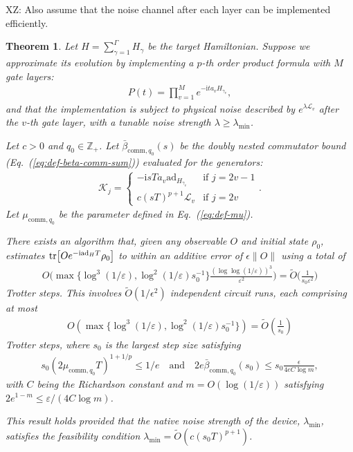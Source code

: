 \documentclass[11pt]{article}
\newtheorem{theorem}{Theorem}
\newcommand{\eq}[1]{(\ref{eq:#1})}
\renewcommand{\i}{\mathrm{i}}
\renewcommand{\L}{\mathcal{L}}
\newcommand{\ad}{\mathrm{ad}}
\newcommand{\eps}{\varepsilon}
\newcommand{\mb}{\mathbb}
\newcommand{\xz}[1]{{\color{cyan} XZ: #1}}
\begin{document}
\xz{Also assume that the noise channel after each layer can be implemented efficiently. }
\begin{theorem}
\label{thm:general-application}
    Let $H = \sum_{\gamma = 1}^{\Gamma} H_{\gamma}$ be the target Hamiltonian. Suppose we approximate its evolution by implementing a $p$-th order product formula with $M$ gate layers:
    \begin{align*}
        P(t) = \prod_{v=1}^M e^{-\i t a_v H_{\gamma_v}},
    \end{align*}
    and that the implementation is subject to physical noise described by $e^{\lambda \L_v}$ after the $v$-th gate layer, with a tunable noise strength $\lambda \ge \lambda_{\min}$.
    
    Let $c>0$ and $q_0\in \mb Z_+$. Let $\bar{\beta}_{\mathrm{comm},q_0}(s)$ be the doubly nested commutator bound (Eq.~\eq{def-beta-comm-sum}) evaluated for the generators:
    \begin{align*}
        \mathcal{K}_j= \begin{cases}-\i sT a_{v}\ad_{H_{\gamma_v}} & \text{if } j = 2v-1\\ c(sT)^{p+1}\mathcal{L}_v & \text{if } j = 2v \end{cases}.
    \end{align*}
    Let $\mu_{\mathrm{comm},q_0}$ be the parameter defined in Eq.~\eq{def-mu}. 
    
    There exists an algorithm that, given any observable $O$ and initial state $\rho_0$, estimates $\tr[O e^{-\i \ad_H T}\rho_0]$ to within an additive error of $\epsilon\|O\|$ using a total of \begin{align*}
        O\Big( \max\{\log^3(1/\eps), \log^2(1/\eps)s_0^{-1}\}\frac{(\log\log (1/\eps))^3}{\eps^2}\Big)  = \widetilde{O}\Big(\frac{1}{s_0 \eps^2}\Big)
    \end{align*}Trotter steps. This involves $\widetilde{O}(1/\epsilon^2)$ independent circuit runs, each comprising at most 
    \begin{align*}
        O( \max\{\log^3(1/\eps), \log^2(1/\eps)s_0^{-1}\}) = \widetilde{O}\left( \frac{1}{s_0} \right)
    \end{align*} Trotter steps,
    where $s_0$ is the largest step size satisfying
    \begin{align} \label{eq:s0-general}
       s_0 (2\mu_{\mathrm{comm},q_0}T)^{1+1/p} \le 1/e \quad \text{and} \quad
       2e \bar{\beta}_{\mathrm{comm},q_0}(s_0) \le s_0 \frac{\epsilon}{4eC\log m},
    \end{align}
    with $C$ being the Richardson constant and $m = O(\log(1/\eps))$ satisfying $2e^{1-m} \le \eps /(4C\log m)$.
    
    This result holds provided that the native noise strength of the device, $\lambda_{\min}$, satisfies the feasibility condition $\lambda_{\min} = \widetilde{O}(c (s_0 T)^{p+1})$.
\end{theorem}
\end{document}
